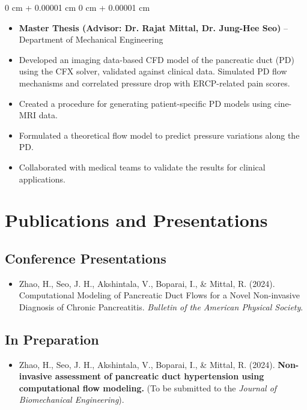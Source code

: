 \documentclass[10pt, letterpaper]{article}
\newenvironment{highlights}{
    \begin{itemize}[
        topsep=0.10 cm,
        parsep=0.10 cm,
        partopsep=0pt,
        itemsep=0pt,
        leftmargin=0 cm + 10pt
    ]
}{
    \end{itemize}
} %
\newenvironment{onecolentry}{
    \begin{adjustwidth}{
        0 cm + 0.00001 cm
    }{
        0 cm + 0.00001 cm
    }
}{
    \end{adjustwidth}
} %
\begin{document}
    \vspace{0.10 cm}
    \begin{onecolentry}
        \begin{highlights}
            \item \textbf{Master Thesis (Advisor: Dr. Rajat Mittal, Dr. Jung-Hee Seo)} – Department of Mechanical Engineering
            \item Developed an imaging data-based CFD model of the pancreatic duct (PD) using the CFX solver, validated against clinical data. Simulated PD flow mechanisms and correlated pressure drop with ERCP-related pain scores.
            \item Created a procedure for generating patient-specific PD models using cine-MRI data.
            \item Formulated a theoretical flow model to predict pressure variations along the PD.
            \item Collaborated with medical teams to validate the results for clinical applications.
        \end{highlights}
    \end{onecolentry}

    \vspace{0.2 cm}

    \section{Publications and Presentations}


    \subsection*{Conference Presentations}
    \begin{itemize}[leftmargin=*, itemsep=0pt]
        \item Zhao, H., Seo, J. H., Akshintala, V., Boparai, I., \& Mittal, R. (2024). Computational Modeling of Pancreatic Duct Flows for a Novel Non-invasive Diagnosis of Chronic Pancreatitis. \textit{Bulletin of the American Physical Society}.
    \end{itemize}

    \subsection*{In Preparation}
    \begin{itemize}[leftmargin=*, itemsep=0pt]
        \item Zhao, H., Seo, J. H., Akshintala, V., Boparai, I., \& Mittal, R. (2024). \textbf{Non-invasive assessment of pancreatic duct hypertension using computational flow modeling.} (To be submitted to the \textit{Journal of Biomechanical Engineering}).
    \end{itemize}
\end{document}

